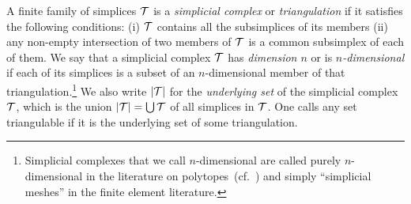 \documentclass[10pt,a4paper]{article}
\begin{document}
A finite family of simplices ${\mathcal T}$ is a \emph{simplicial complex} or \emph{triangulation} if it satisfies the following conditions: 
(i) ${\mathcal T}$ contains all the subsimplices of its members (ii) any non-empty intersection of two members of ${\mathcal T}$ is a common subsimplex of each of them. 
We say that a simplicial complex ${\mathcal T}$ has \emph{dimension $n$} or is \emph{$n$-dimensional} if each of its simplices is a subset of an $n$-dimensional member of that triangulation.\footnote{Simplicial complexes that we call $n$-dimensional are called purely $n$-dimensional in the literature on polytopes~(cf.\ \cite{ziegler1995lectures}) and simply ``simplicial meshes'' in the finite element literature.} 
We also write $\left| {\mathcal T} \right|$ for the \emph{underlying set} of the simplicial complex ${\mathcal T}$, 
which is the union $\left| {\mathcal T} \right| = \bigcup {\mathcal T}$ of all simplices in ${\mathcal T}$.
One calls any set triangulable if it is the underlying set of some triangulation. 


\begin{comment}
\begin{remark}
    Our main interest in this manuscript are finite triangulations of compact sets. 
    There is another reason why we insist on the triangulation being finite: 
    if we do not require our simplicial complexes to be finite,
    then a reasonable definition of simplicial complex would need additional topological conditions. 
    For example, if we modify our definition of simplicial complex to be infinite, 
    then any subset of Euclidean space would give rise to an ``infinite $0$-dimensional complex''. But this obviously does not reflect the topology. 
    A more interesting such example is this:
    the Cantor set $\calC \subseteq [0,1]$ is a compact set 
    that underlies an ``infinite $0$-dimensional simplicial complex''.
    If we place $\calC$ on the x-axis of a 2D coordinate system 
    and connect each member of $\calC$ to $(0,1) \in \bbR^{2}$ via a straight line segment, 
    then the resulting set is still compact, even path-connected,  
    but has an ``infinite $1$-dimensional triangulation''.
    However, none of these infinite families are infinite simplicial complexes in the sense of geometric topology~\cite{lee2011topological}. 
\end{remark}
\end{comment}
\end{document}
